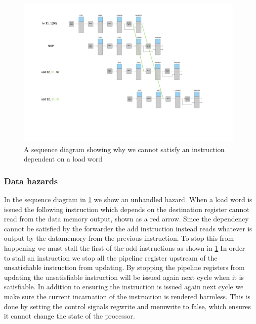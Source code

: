 \begin{figure}[h!]
    \includegraphics[width=\linewidth]{img/lw_hazard.png}
    \caption{A sequence diagram showing why we cannot satisfy an instruction dependent on a load word}
    \label{fig:hazard1}
\end{figure}

\subsubsection{Data hazards}
In the sequence diagram in \ref{fig:hazard1} we show an unhandled hazard. When a load word is issued the following instruction which depends on the destination register cannot read from the data memory output, shown as a red arrow.
Since the dependency cannot be satisfied by the forwarder the add instruction instead reads whatever is output by the datamemory from the previous instruction.
To stop this from happening we must stall the first of the add instructions as shown in \ref{fig:hazard1} 
In order to stall an instruction we stop all the pipeline register upstream of the unsatisfiable instruction from updating. 
By stopping the pipeline registers from updating the unsatisfiable instruction will be issued again next cycle when it is satisfiable.
In addition to ensuring the instruction is issued again next cycle we make sure the current incarnation of the instruction is rendered harmless.
This is done by setting the control signals regwrite and memwrite to false, which ensures it cannot change the state of the processor.

